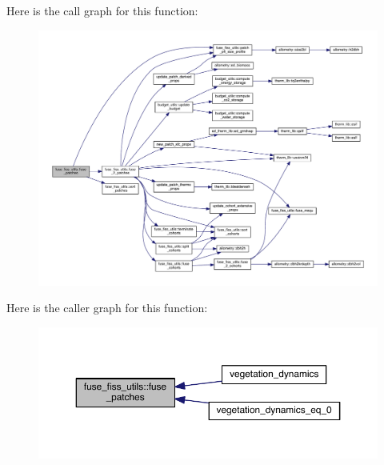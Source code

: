 Here is the call graph for this function\+:\nopagebreak
\begin{figure}[H]
\begin{center}
\leavevmode
\includegraphics[width=350pt]{namespacefuse__fiss__utils_aee30640ff825246fb4c9f5f1f41470be_cgraph}
\end{center}
\end{figure}




Here is the caller graph for this function\+:\nopagebreak
\begin{figure}[H]
\begin{center}
\leavevmode
\includegraphics[width=350pt]{namespacefuse__fiss__utils_aee30640ff825246fb4c9f5f1f41470be_icgraph}
\end{center}
\end{figure}


\hypertarget{namespacefuse__fiss__utils_ac7660eaa2d7565040ef120ac454ef406}{}
